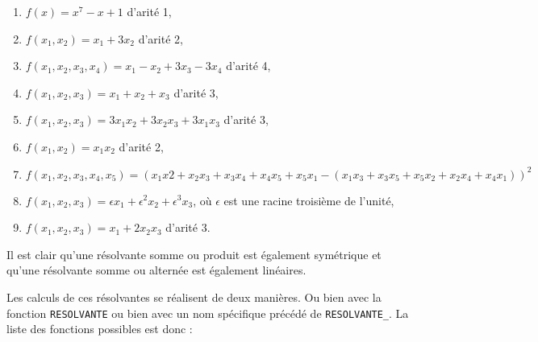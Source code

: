 \documentclass[11pt]{article}
\begin{document}
\begin{enumerate}
\item $f(x)=x^7-x+1$ d'arit\'e 1,
\item $f(x_1,x_2) = x_1+3x_2$ d'arit\'e 2,
\item $f(x_1,x_2,x_3,x_4) = x_1 -x_2 + 3x_3-3x_4$ d'arit\'e 4,
\item $f(x_1,x_2,x_3) = x_1+x_2+x_3$ d'arit\'e 3,
\item $f(x_1,x_2,x_3) = 3x_1x_2 + 3x_2x_3 +3x_1x_3$ d'arit\'e 3,
\item $f(x_1,x_2) =x_1x_2$ d'arit\'e 2,
\item $f(x_1,x_2,x_3,x_4,x_5)=(x_1x2+x_2x_3+x_3x_4+x_4x_5+x_5x_1 -
        (x_1x_3+x_3x_5+x_5x_2+x_2x_4+x_4x_1))^2$
\item $f(x_1,x_2,x_3) = \epsilon x_1 + \epsilon^2 x_2 + \epsilon^3
x_3$, o\`u $\epsilon$ est une racine troisi\`eme de l'unit\'e,
\item $f(x_1,x_2,x_3) = x_1 +2x_2x_3$ d'arit\'e 3.
\end{enumerate}
Il est clair qu'une r\'esolvante somme ou produit est \'egalement
sym\'etrique et qu'une r\'esolvante somme ou altern\'ee est
\'egalement lin\'eaires.

Les calculs de ces r\'esolvantes se r\'ealisent de deux mani\`eres. Ou bien 
avec la fonction {\tt RESOLVANTE} ou bien avec un nom sp\'ecifique 
pr\'ec\'ed\'e de {\tt RESOLVANTE\_}. La liste des fonctions possibles est 
donc :
\end{document}
